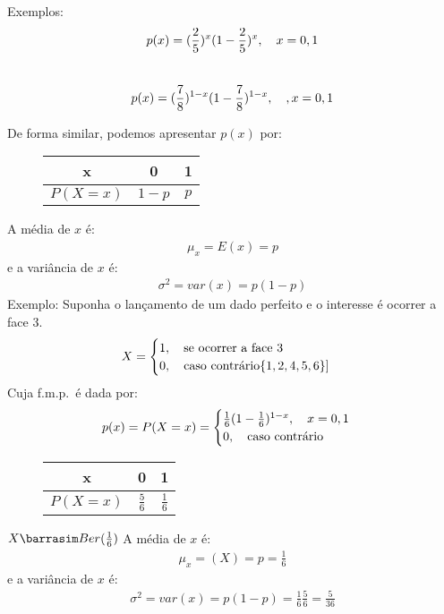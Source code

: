 \documentclass[11pt,a4paper]{article}
\begin{document}
Exemplos: 
$$p(x)=(\frac{2}{5})^x(1-\frac{2}{5})^x, \text{\quad}x=0,1$$\\
$$p(x)=(\frac{7}{8})^{1-x}(1-\frac{7}{8})^{1-x}, \text{\quad }, x=0,1$$

De forma similar, podemos apresentar $p(x)$ por:
\begin{figure} 
  \centering
  \begin{tabular}{c c c}
    \toprule
    x&0&1\\ \midrule
    $P(X=x)$&$1-p$&$p$\\ \bottomrule
  \end{tabular}
  \label{fig:7}
\end{figure}
A média de $x$ é: 
\begin{align}
  \mu_{x}=E(x)=p
\end{align}
e a variância de $x$ é: 
\begin{align}
  \sigma^2 = var(x)=p (1-p)
\end{align}
Exemplo: Suponha o lançamento de um dado perfeito e o interesse é ocorrer a face
3.
\begin{align*}
  X=\begin{cases}
    1, \text{\quad se ocorrer a face }3\\
    0, \text{\quad caso contrário}\{1,2,4,5,6\}]
  \end{cases}
\end{align*}
Cuja f.m.p.\ é dada por:
\begin{align}
  p(x)=P(X=x)=\begin{cases}
    \frac{1}{6}(1-\frac{1}{6})^{1-x}, \text{\quad}x=0,1\\
    0, \text{\quad caso contrário}
  \end{cases}
\end{align}
\begin{figure} 
  \centering
  \begin{tabular}{c c c}
    \toprule
    x&0&1\\ \midrule
    $P(X=x)$&$\frac{5}{6}$&$\frac{1}{6}$\\ \bottomrule
  \end{tabular}
  \label{fig:8}
\end{figure}
$X \barrasim Ber(\frac{1}{6})$
A média de $x$ é: 
\begin{align*}
  \mu_{x}=(X)=p=\frac{1}{6}
\end{align*}
e a variância de $x$ é: 
\begin{align*}
  \sigma^2= var(x)=p(1-p)=\frac{1}{6}\frac{5}{6}=\frac{5}{36}
\end{align*}
\end{document}
